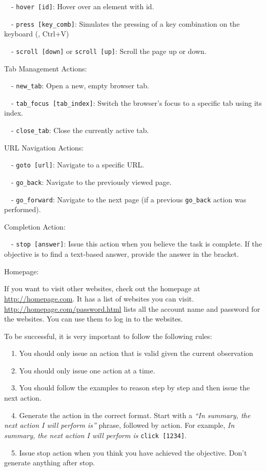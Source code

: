 \begin{tcolorbox}[colframe=green!50!black, colback=green!10!white, title=Action Proposal, breakable]
~~- \texttt{hover [id]}: Hover over an element with id.

~~- \texttt{press [key\_comb]}: Simulates the pressing of a key combination on the keyboard (\eg, Ctrl+V)

~~- \texttt{scroll [down]} or \texttt{scroll [up]}: Scroll the page up or down.

\medskip

Tab Management Actions:

~~- \texttt{new\_tab}: Open a new, empty browser tab.

~~- \texttt{tab\_focus [tab\_index]}: Switch the browser's focus to a specific tab using its index.

~~- \texttt{close\_tab}: Close the currently active tab.

\medskip

URL Navigation Actions:

~~- \texttt{goto [url]}: Navigate to a specific URL.

~~- \texttt{go\_back}: Navigate to the previously viewed page.

~~- \texttt{go\_forward}: Navigate to the next page (if a previous \texttt{go\_back} action was performed).

\medskip

Completion Action:

~~- \texttt{stop [answer]}: Issue this action when you believe the task is complete. If the objective is to find a text-based answer, provide the answer in the bracket.

\medskip

Homepage:

If you want to visit other websites, check out the homepage at \underline{http://homepage.com}. It has a list of websites you can visit.
\underline{http://homepage.com/password.html} lists all the account name and password for the websites. You can use them to log in to the websites.

\medskip

To be successful, it is very important to follow the following rules:

~~1. You should only issue an action that is valid given the current observation

~~2. You should only issue one action at a time.

~~3. You should follow the examples to reason step by step and then issue the next action.

~~4. Generate the action in the correct format. Start with a \textit{``In summary, the next action I will perform is''} phrase, followed by action. For example, \textit{In summary, the next action I will perform is }\texttt{click [1234]}.

~~5. Issue stop action when you think you have achieved the objective. Don't generate anything after stop.

\end{tcolorbox}






